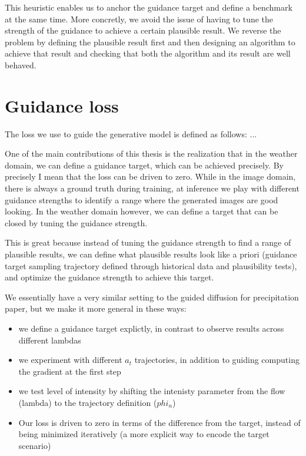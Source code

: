 This heuristic enables us to anchor the guidance target and define a benchmark at the same time.
More concretly, we avoid the issue of having to tune the strength of the guidance to achieve a certain plausible result.
We reverse the problem by defining the plausible result first and then designing an algorithm to achieve that result and checking that both the algorithm and its result are well behaved.

\section{Guidance loss}

The loss we use to guide the generative model is defined as follows:
...

One of the main contributions of this thesis is the realization that in the weather domain, we can define a guidance target, which can be achieved precisely.
By precisely I mean that the loss can be driven to zero.
While in the image domain, there is always a ground truth during training, at inference we play with different guidance strengths to identify a range where the generated images are good looking.
In the weather domain however, we can define a target that can be closed by tuning the guidance strength.

This is great because instead of tuning the guidance strength to find a range of plausible results, we can define what plausible results look like a priori (guidance target sampling trajectory defined through historical data and plausibility tests), and optimize the guidance strength to achieve this target. 



We essentially have a very similar setting to the guided diffusion for precipitation paper, but we make it more general in these ways:
\begin{itemize}
    \item we define a guidance target explictly, in contrast to observe results across different lambdas
    \item we experiment with different $a_t$ trajectories, in addition to guiding computing the gradient at the first step
    \item we test level of intensity by shifting the intenisty parameter from the flow (lambda) to the trajectory definition ($phi_n$)
    \item Our loss is driven to zero in terms of the difference from the target, instead of being minimized iteratively (a more explicit way to encode the target scenario)
\end{itemize}

